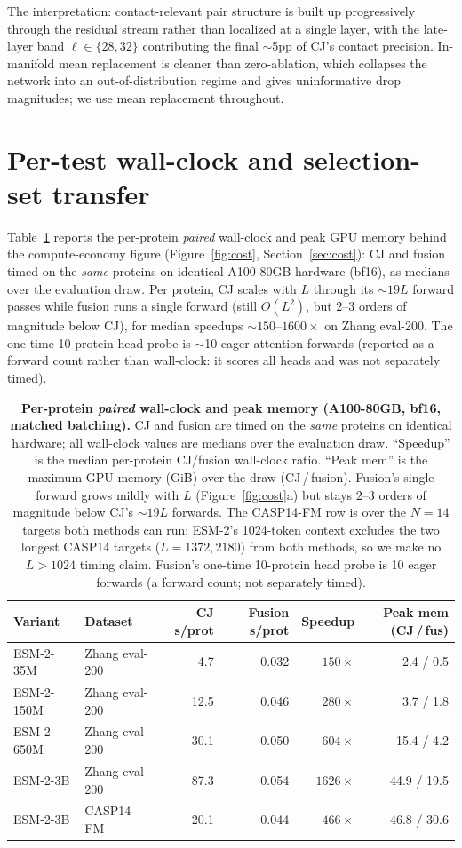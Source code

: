 \documentclass{article}
\begin{document}
The interpretation: contact-relevant pair structure is built up
progressively through the residual stream rather than localized at a
single layer, with the late-layer band $\ell \in \{28, 32\}$
contributing the final $\sim$5pp of CJ's contact precision. In-manifold
mean replacement is cleaner than zero-ablation, which collapses the
network into an out-of-distribution regime and gives uninformative
drop magnitudes; we use mean replacement throughout.

\section{Per-test wall-clock and selection-set transfer}
\label{app:a5}

Table~\ref{tab:a5} reports the per-protein \emph{paired} wall-clock and peak
GPU memory behind the compute-economy figure (Figure~\ref{fig:cost},
Section~\ref{sec:cost}): CJ and fusion timed on the \emph{same} proteins on
identical A100-80GB hardware (bf16), as medians over the evaluation draw. Per
protein, CJ scales with $L$ through its $\sim 19L$ forward passes while fusion
runs a single forward (still $O(L^2)$, but $2$--$3$ orders of magnitude below
CJ), for median speedups $\sim 150$--$1600\times$ on Zhang eval-200. The
one-time 10-protein head probe is $\sim$10 eager attention forwards (reported
as a forward count rather than wall-clock: it scores all heads and was not
separately timed).

\begin{table}[h]
\centering
\small
\caption{\textbf{Per-protein \emph{paired} wall-clock and peak memory
(A100-80GB, bf16, matched batching).} CJ and fusion are timed on the
\emph{same} proteins on identical hardware; all wall-clock values are
medians over the evaluation draw. ``Speedup'' is the median per-protein
CJ/fusion wall-clock ratio. ``Peak mem'' is the maximum GPU memory (GiB)
over the draw (CJ\,/\,fusion). Fusion's single forward grows mildly with
$L$ (Figure~\ref{fig:cost}a) but stays $2$--$3$ orders of magnitude below
CJ's $\sim 19L$ forwards. The CASP14-FM row is over the $N{=}14$ targets
both methods can run; ESM-2's 1024-token context excludes the two longest
CASP14 targets ($L{=}1372, 2180$) from both methods, so we make no
$L>1024$ timing claim. Fusion's one-time 10-protein head probe is 10 eager
forwards (a forward count; not separately timed).}
\label{tab:a5}
\begin{tabular}{llrrrr}
\toprule
Variant & Dataset & CJ s/prot & Fusion s/prot & Speedup & Peak mem (CJ\,/\,fus) \\
\midrule
ESM-2-35M  & Zhang eval-200 & 4.7  & 0.032 & $150\times$  & 2.4 / 0.5 \\
ESM-2-150M & Zhang eval-200 & 12.5 & 0.046 & $280\times$  & 3.7 / 1.8 \\
ESM-2-650M & Zhang eval-200 & 30.1 & 0.050 & $604\times$  & 15.4 / 4.2 \\
ESM-2-3B   & Zhang eval-200 & 87.3 & 0.054 & $1626\times$ & 44.9 / 19.5 \\
ESM-2-3B   & CASP14-FM      & 20.1 & 0.044 & $466\times$  & 46.8 / 30.6 \\
\bottomrule
\end{tabular}
\end{table}
\end{document}
